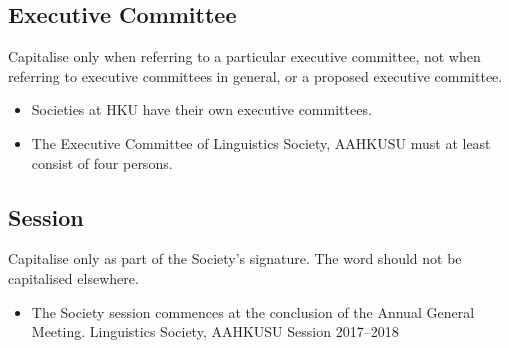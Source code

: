 \documentclass[11pt,a4paper]{book}
\newcommand{\cmark}{{\color{green(html/cssgreen)}\checkmark}}%
\begin{document}
			\subsection{Executive Committee}
			Capitalise only when referring to a particular executive committee, not when referring to executive committees in general, or a proposed executive committee.
				{\firasans \begin{mdframed}[backgroundcolor=aliceblue] \begin{itemize}[label=\cmark]
					\item Societies at HKU have their own executive committees.
					\item The Executive Committee of Linguistics Society, AAHKUSU must at least consist of four persons.
				\end{itemize} \end{mdframed} }
			\subsection{Session}
			Capitalise only as part of the Society's signature. The word should not be capitalised elsewhere.
				{\firasans \begin{mdframed}[backgroundcolor=aliceblue] \begin{itemize}[label=\cmark]
					\item The Society session commences at the conclusion of the Annual General Meeting.
					Linguistics Society, AAHKUSU Session 2017--2018
				\end{itemize} \end{mdframed} }
\end{document}
